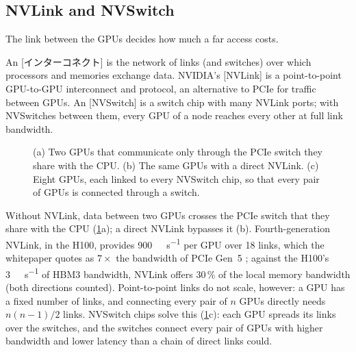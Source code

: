 \documentclass[../main.tex]{subfiles}
\begin{document}
\subsection{NVLink and NVSwitch}

The link between the GPUs decides how much a far access costs.

\begin{definition}
  An [インターコネクト] is the network of links (and
  switches) over which processors and memories exchange data.
  NVIDIA's [NVLink] is a point-to-point GPU-to-GPU
  interconnect and protocol, an alternative to PCIe for traffic between
  GPUs.  An [NVSwitch] is a switch chip with many NVLink
  ports; with NVSwitches between them, every GPU of a node reaches every
  other at full link bandwidth.
\end{definition}


\begin{figure}[tb]
  \centering
  
  \caption{(a) Two GPUs that communicate only through the PCIe switch
    they share with the CPU.  (b) The same GPUs with a direct NVLink.
    (c) Eight GPUs, each linked to every NVSwitch chip, so that every
    pair of GPUs is connected through a switch.}
  \label{fig:l09-interconnect}
\end{figure}

Without NVLink, data between two GPUs crosses the PCIe switch that they
share with the CPU (\cref{fig:l09-interconnect}a); a direct NVLink
bypasses it (b).  Fourth-generation NVLink, in the H100, provides
\SI{900}{\giga\byte\per\second} per GPU over 18 links, which the
whitepaper quotes as $7\times$ the bandwidth of PCIe Gen~5
\cite{nvidia2022hopper}; against the H100's \SI{3}{\tera\byte\per\second}
of HBM3 bandwidth, NVLink offers 30\,\% of the local memory bandwidth
(both directions counted).  Point-to-point links do not scale, however: a
GPU has a fixed number of links, and connecting every pair of $n$ GPUs
directly needs $n(n-1)/2$ links.  NVSwitch chips solve this
(\cref{fig:l09-interconnect}c): each GPU spreads its links over the
switches, and the switches connect every pair of GPUs with higher
bandwidth and lower latency than a chain of direct links could.
\end{document}
